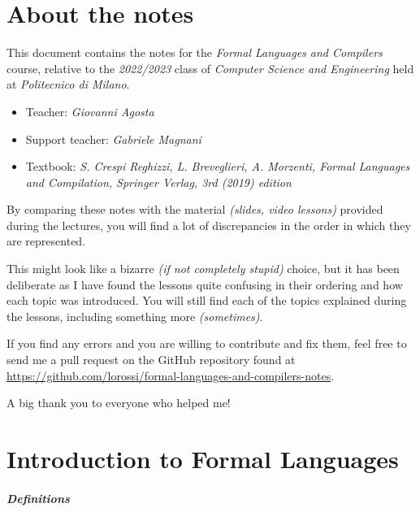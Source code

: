 \documentclass[english]{article}
\begin{document}
\makecover

\section*{About the notes}

This document contains the notes for the \textit{Formal Languages and Compilers} course, relative to the \textit{2022/2023} class of \textit{Computer Science and Engineering} held at \textit{Politecnico di Milano}.

\bigskip
\begin{itemize}
  \item Teacher: \textit{Giovanni Agosta}
  \item Support teacher: \textit{Gabriele Magnani}
  \item Textbook: \textit{S. Crespi Reghizzi, L. Breveglieri, A. Morzenti, Formal Languages and Compilation, Springer Verlag, 3rd (2019) edition}
\end{itemize}

\bigskip
By comparing these notes with the material \textit{(slides, video lessons)} provided during the lectures, you will find a lot of discrepancies in the order in which they are represented.

This might look like a bizarre \textit{(if not completely stupid)} choice, but it has been deliberate as I have found the lessons quite confusing in their ordering and how each topic was introduced.
You will still find each of the topics explained during the lessons, including something more \textit{(sometimes)}.

\bigskip
If you find any errors and you are willing to contribute and fix them, feel free to send me a pull request on the GitHub repository found at \href{github.com/lorossi/formal-languages-and-compilers-notes}{https://github.com/lorossi/formal-languages-and-compilers-notes}.

\bigskip
A big thank you to everyone who helped me!

\clearpage

\section{Introduction to Formal Languages}

\subparagraph*{Definitions}
\end{document}
